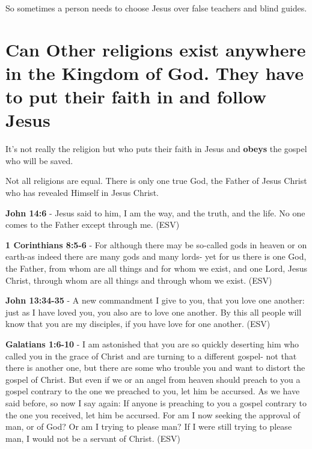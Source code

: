\documentclass[11pt]{article}
\begin{document}
So sometimes a person needs to choose Jesus over false teachers and blind guides.

\section{Can Other religions exist anywhere in the Kingdom of God. They have to put their faith in and follow Jesus}
\label{sec:org860314d}
It's not really the religion but who puts their faith in Jesus and \textbf{obeys} the gospel who will be saved.

Not all religions are equal.
There is only one true God, the Father of Jesus Christ who has revealed Himself in Jesus Christ.

\textbf{John 14:6} -  Jesus said to him, I am the way, and the truth, and the life.  No one comes to the Father except through me.  (ESV)

\textbf{1 Corinthians 8:5-6} -  For although there may be so-called gods in heaven or on earth-as indeed there are many gods and many lords- yet for us there is one God, the Father, from whom are all things and for whom we exist, and one Lord, Jesus Christ, through whom are all things and through whom we exist.  (ESV)

\textbf{John 13:34-35} -  A new commandment I give to you, that you love one another: just as I have loved you, you also are to love one another.  By this all people will know that you are my disciples, if you have love for one another.  (ESV)

\textbf{Galatians 1:6-10} -  I am astonished that you are so quickly deserting him who called you in the grace of Christ and are turning to a different gospel- not that there is another one, but there are some who trouble you and want to distort the gospel of Christ.  But even if we or an angel from heaven should preach to you a gospel contrary to the one we preached to you, let him be accursed.  As we have said before, so now I say again: If anyone is preaching to you a gospel contrary to the one you received, let him be accursed.  For am I now seeking the approval of man, or of God?  Or am I trying to please man?  If I were still trying to please man, I would not be a servant of Christ.  (ESV)
\end{document}
